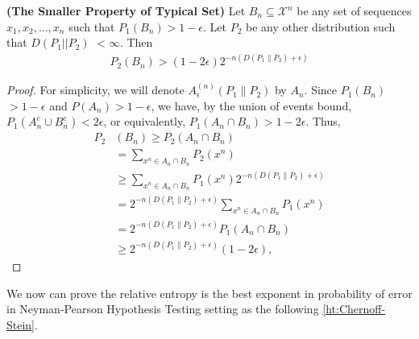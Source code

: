 \documentclass{article}
\newcommand{\bfs}[1]{\textbf{({#1})}}
\begin{document}
\begin{lema}{\bfs{The Smaller Property of Typical Set}} \label{ht:lem1}
Let $B_{n} \subseteq \mathcal{X}^{n}$ be any set of sequences $x_{1}, x_{2}, \ldots, x_{n}$ such that $P_{1}\left(B_{n}\right)>1-\epsilon$. Let $P_{2}$ be any other distribution such that $D\left(P_{1}|| P_{2}\right)$ $<\infty$. Then 
\begin{align*}
    P_{2}\left(B_{n}\right)>(1-2 \epsilon) 2^{-n\left(D\left(P_{1} \| P_{2}\right)+\epsilon\right)}
\end{align*}
\end{lema} 
\begin{proof}
For simplicity, we will denote $A_{\epsilon}^{(n)}\left(P_{1} \| P_{2}\right)$ by $A_{n}$. Since $P_{1}\left(B_{n}\right)$ $>1-\epsilon$ and $P\left(A_{n}\right)>1-\epsilon$, we have, by the union of events bound, $P_{1}\left(A_{n}^{c} \cup B_{n}^{c}\right)<2 \epsilon$, or equivalently, $P_{1}\left(A_{n} \cap B_{n}\right)>1-2 \epsilon$. Thus,
\begin{align*}
P_{2}&\left(B_{n}\right) \geq P_{2}\left(A_{n} \cap B_{n}\right)\\
&=\sum_{x^{n} \in A_{n} \cap B_{n}} P_{2}\left(x^{n}\right) \\
& \geq \sum_{x^{n} \in A_{n} \cap B_{n}} P_{1}\left(x^{n}\right) 2^{-n\left(D\left(P_{1} \| P_{2}\right)+\epsilon\right)} \\
&=2^{-n\left(D\left(P_{1} \| P_{2}\right)+\epsilon\right)} \sum_{x^{n} \in A_{n} \cap B_{n} }P_{1}\left(x^{n}\right) \\
&=2^{-n\left(D\left(P_{1} \| P_{2}\right)+\epsilon\right)} P_{1}\left(A_{n} \cap B_{n}\right) \\
& \geq 2^{-n\left(D\left(P_{1} \| P_{2}\right)+\epsilon\right)}(1-2 \epsilon),
\end{align*}
\end{proof} 

We now can prove the relative entropy is the best exponent in probability of error in Neyman-Pearson Hypothesis Testing setting as the following \cref{ht:Chernoff-Stein}.
\end{document}
